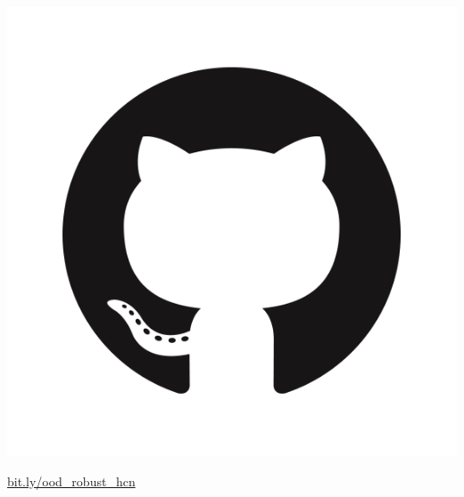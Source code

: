 \documentclass[final]{beamer}
\newlength{\sepwidth}
\newlength{\colwidth}
\newcommand{\separatorcolumn}{\begin{column}{\sepwidth}\end{column}}
\begin{document}
\begin{frame}[t]
\begin{columns}[t]
\begin{column}{\paperwidth}
\centering
\Large
\begin{minipage}[c]{0.05\paperwidth}
\includegraphics[scale=0.2]{img/GitHub-Mark.png}
\end{minipage}
\begin{minipage}[c]{0.15\paperwidth}
\href{https://bit.ly/ood_robust_hcn}{bit.ly/ood\_robust\_hcn}
\end{minipage}

\end{column}
\end{columns}




\end{frame}
\end{document}
